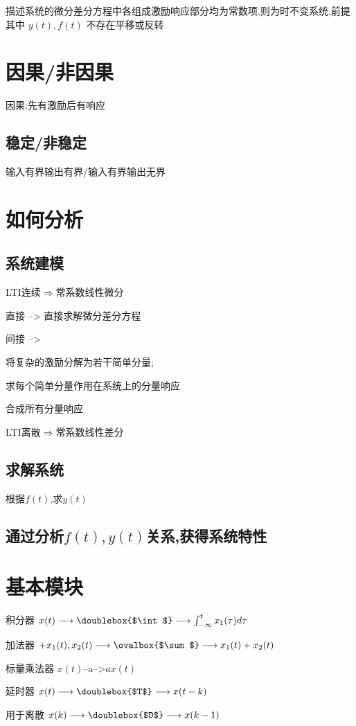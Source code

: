 \documentclass{article}
\begin{document}
    描述系统的微分差分方程中各组成激励响应部分均为常数项,则为时不变系统,前提其中 $y(t),f(t)$ 不存在平移或反转

    \section{因果/非因果}%
    因果:先有激励后有响应
    \subsection{稳定/非稳定}%
    输入有界输出有界/输入有界输出无界

    \section{如何分析}%
    \subsection{系统建模}%
    LTI连续$\Longrightarrow$常系数线性微分

    直接  -->  直接求解微分差分方程

    间接  -->  

    将复杂的激励分解为若干简单分量;

    求每个简单分量作用在系统上的分量响应

    合成所有分量响应

    LTI离散$\Longrightarrow$常系数线性差分
    \subsection{求解系统}%
    根据$f(t)$,求$y(t)$
    \subsection{通过分析$f(t),y(t)$关系,获得系统特性}%

    \section{基本模块}%
    
    积分器
    $x(t)\longrightarrow\doublebox{$\int$}\longrightarrow\int_{-\infty}^{t}x_1(\tau)d\tau$

    加法器
    $+x_1(t),x_2(t)\longrightarrow\ovalbox{$\sum$}\longrightarrow x_1(t)+x_2(t)$

    标量乘法器
    $x(t)$--a-->$ax(t)$

    延时器
    $x(t)\longrightarrow\doublebox{$T$}\longrightarrow x(t-k)$ 

    用于离散
    $x(k)\longrightarrow\doublebox{$D$}\longrightarrow x(k-1)$
\end{document}
